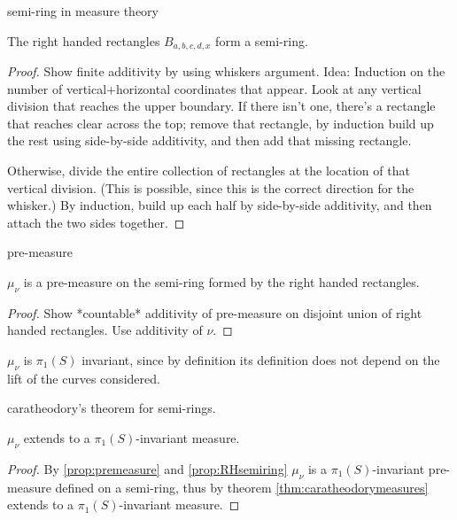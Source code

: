 \begin{definition}
semi-ring in measure theory
\end{definition}

\begin{proposition}\label{prop:RHsemiring}
The right handed rectangles $B_{a,b,c,d,x}$ form a semi-ring.
\end{proposition}
\begin{proof}
Show finite additivity by using whiskers argument. Idea:
 Induction on the number of vertical+horizontal
coordinates that appear. Look at any vertical division that reaches
the upper boundary. If there isn't one, there's a rectangle that
reaches clear across the top; remove that rectangle, by induction
build up the rest using side-by-side additivity, and then add that
missing rectangle.

Otherwise, divide the entire collection of rectangles at the location
of that vertical division. (This is possible, since this is the
correct direction for the whisker.) By induction, build up each half
by side-by-side additivity, and then attach the two sides together.
\end{proof}

\begin{definition}
pre-measure
\end{definition}

\begin{proposition}\label{prop:premeasure}
$\mu_{\nu}$ is a pre-measure on the semi-ring formed by the right handed rectangles.
\end{proposition}
\begin{proof}
Show *countable* additivity of pre-measure on disjoint union of right handed rectangles. Use additivity of $\nu$.
\end{proof}

\begin{remark}
$\mu_{\nu}$ is $\pi_1(S)$ invariant, since by definition its definition does not depend on the lift of the curves considered.
\end{remark}
\begin{theorem}\label{thm:caratheodorymeasures}
caratheodory's theorem for semi-rings.
\end{theorem}

\begin{proposition}
$\mu_{\nu}$ extends to a $\pi_1(S)$-invariant measure.
\end{proposition}
\begin{proof}
By \ref{prop:premeasure} and \ref{prop:RHsemiring} $\mu_{\nu}$ is a $\pi_1(S)$-invariant pre-measure defined on a semi-ring, thus by theorem \ref{thm:caratheodorymeasures} extends to a $\pi_1(S)$-invariant measure.
\end{proof}


